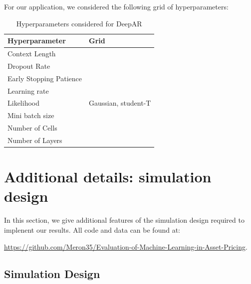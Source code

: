 \documentclass{article}
\begin{document}
For our application, we considered the following grid of hyperparameters:
\begin{table}[!htb]
	\begin{tabular}{|ll|}
		\hline
		Hyperparameter & Grid \\ \hline
		Context Length & \\
		Dropout Rate & \\
		Early Stopping Patience & \\
		Learning rate & \\
		Likelihood & Gaussian, student-T \\
		Mini batch size & \\
		Number of Cells & \\
		Number of Layers & 
	\end{tabular}
	\caption{Hyperparameters considered for DeepAR}
\end{table}

\newpage

\section{Additional details: simulation design}
In this section, we give additional features of the simulation design required to implenent our results. All code and data can be found at:

\url{https://github.com/Meron35/Evaluation-of-Machine-Learning-in-Asset-Pricing}.

\subsection{Simulation Design}\label{app:simDesign}
\end{document}
